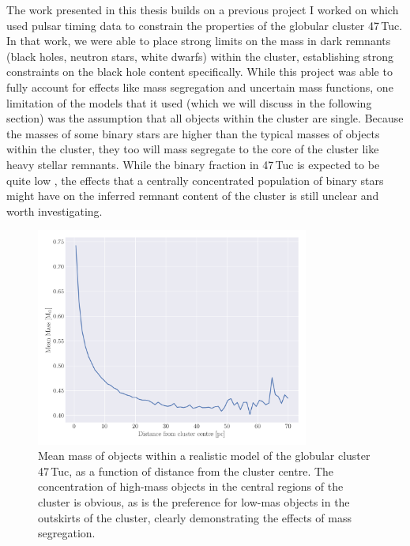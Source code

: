 The work presented in this thesis builds on a previous project I worked on which used pulsar timing
data to constrain the properties of the globular cluster 47\,Tuc. In that work, we were able to
place strong limits on the mass in dark remnants (black holes, neutron stars, white dwarfs) within
the cluster, establishing strong constraints on the black hole content specifically. While this
project was able to fully account for effects like mass segregation and uncertain mass functions,
one limitation of the models that it used (which we will discuss in the following section) was the
assumption that all objects within the cluster are single. Because the masses of some binary stars
are higher than the typical masses of objects within the cluster, they too will mass segregate to
the core of the cluster like heavy stellar remnants. While the binary fraction in 47\,Tuc is
expected to be quite low \citep{Milone2012}, the effects that a centrally concentrated population of
binary stars might have on the inferred remnant content of the cluster is still unclear and worth
investigating.



\begin{figure}
	\centering
	\includegraphics[width=0.8\textwidth]{figures/radial_mean_mass.png}
	\caption{Mean mass of objects within a realistic model of the globular cluster 47\,Tuc, as a
		function of distance from the cluster centre. The concentration of high-mass objects in the central regions of
		the cluster is obvious, as is the preference for low-mas objects in the outskirts of
		the cluster, clearly demonstrating the effects of mass segregation.}
	\label{fig:1/radial_mean_mass}
\end{figure}




